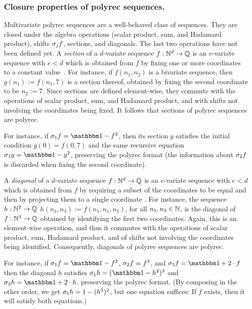 \subsubsection{Closure properties of polyrec sequences.}
\label{sec:polyrec properties}
%
Multivariate polyrec sequences are a well-behaved class of sequences.
%
They are closed under the algebra operations (scalar product, sum, and Hadamard product),
shifts $\sigma_{j} f$, sections, and diagonals.
%
The last two operations have not been defined yet.
%
A \emph{section} of a {$d$-variate} sequence $f : \mathbb N^d \to \mathbb Q$
is an {$e$-variate} sequence with $e < d$ which is obtained from $f$
by fixing one or more coordinates to a constant value~\cite[Definition 3.1]{Lipshitz:D-finite:JA:1989}.
%
For instance, if $f(n_1, n_2)$ is a bivariate sequence, then $g(n_1) := f(n_1, 7)$ is a section thereof,
obtained by fixing the second coordinate to be $n_2 := 7$.
%
Since sections are defined element-wise,
they commute with the operations of scalar product, sum, and Hadamard product,
and with shifts not involving the coordinates being fixed.
%
It follows that sections of polyrec sequences are polyrec.

\begin{example}
    For instance, if $\shift 1 f = \one - f^2$,
    then its section $g$ satisfies the initial condition $g(0) = f(0, 7)$
    and the same recursive equation $\shift 1 g = \one - g^2$,
    preserving the polyrec format
    (the information about $\sigma_{2} f$ is discarded when fixing the second coordinate).
\end{example}

A \emph{diagonal} of a {$d$-variate} sequence $f : \mathbb N^d \to \mathbb Q$
is an $e$-variate sequence with $e < d$ which is obtained from $f$
by requiring a subset of the coordinates to be equal
and then by projecting them to a single coordinate\-
\cite[Definition 2.6]{Lipshitz:D-finite:JA:1989}.
%
For instance, the sequence $h : \mathbb N^2 \to \mathbb Q$ \st\-
$h(n_1, n_3) := f(n_1, n_1, n_3)$, for all  $n_1, n_3 \in \mathbb N$,
is the diagonal of $f : \mathbb N^3 \to \mathbb Q$
obtained by identifying the first two coordinates.
%
Again, this is an element-wise operation,
and thus it commutes with the operations of scalar product, sum, Hadamard product,
and of shifts not involving the coordinates being identified.
%
Consequently, diagonals of polyrec sequences are polyrec.

\begin{example}
    For instance, if $\shift 1 f = \one - f^2$, $\sigma_{2} f = f^3$, and $\shift 3 f = \one + 2 \cdot f$
    then the diagonal $h$ satisfies $\shift 1 h = (\one - h^2)^3$ and $\shift 2 h = \one + 2 \cdot h$,
    preserving the polyrec format.
    (By composing in the other order, we get $\sigma_{1} h = 1 - (h^3)^2$, but one equation suffices:
    If $f$ exists, then it will satisfy both equations.)
\end{example}

